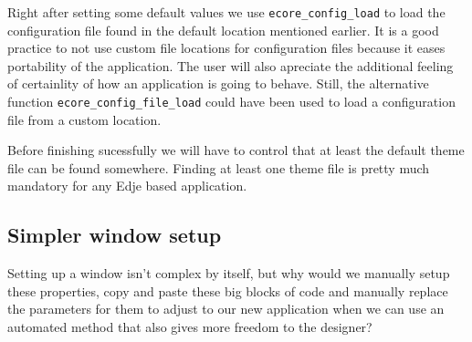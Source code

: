 \documentclass[12pt,a4paper,english]{book}
\begin{document}
Right after setting some default values we use \texttt{ecore{\_}config{\_}load} to load
the configuration file found in the default location mentioned earlier. It is
a good practice to not use custom file locations for configuration files
because it eases portability of the application. The user will also apreciate
the additional feeling of certainlity of how an application is going to behave.
Still, the alternative function \texttt{ecore{\_}config{\_}file{\_}load} could have been used
to load a configuration file from a custom location.

Before finishing sucessfully we will have to control that at least the default
theme file can be found somewhere. Finding at least one theme file is pretty
much mandatory for any Edje based application.



\hypertarget{simpler-window-setup}{}
\subsection{Simpler window setup}

Setting up a window isn't complex by itself, but why would we manually setup
these properties, copy and paste these big blocks of code and manually
replace the parameters for them to adjust to our new application when we can
use an automated method that also gives more freedom to the designer?
\end{document}
